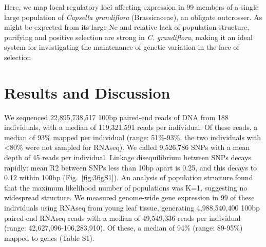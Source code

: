 Here, we map local regulatory loci affecting expression in 99 members of a single large population of \textit{Capsella grandiflora} (Brassicaceae), an obligate outcrosser. As might be expected from its large Ne and relative lack of population structure, purifying and positive selection are strong in \textit{C. grandiflora}\citep{Williamson2014-tf,St_onge2011-jz}, making it an ideal system for investigating the maintenance of genetic variation in the face of selection 

\section{Results and Discussion}
We sequenced 22,895,738,517 100bp paired-end reads of DNA from 188 individuals, with a median of 119,321,591 reads per individual. Of these reads, a median of 93\% mapped per individual (range: 51\%-93\%, the two individuals with \textless 80\% were not sampled for RNAseq). We called 9,526,786 SNPs with a mean depth of 45 reads per individual. Linkage disequilibrium between SNPs decays rapidly: mean R2 between SNPs less than 10bp apart is 0.25, and this decays to 0.12 within 100bp (Fig.~\ref{fig:3figS1}). An analysis of population structure \citep{Raj2014-im} found that the maximum likelihood number of populations was K=1, suggesting no widespread structure. We measured genome-wide gene expression in 99 of these individuals using RNAseq from young leaf tissue, generating 4,988,540,400 100bp paired-end RNAseq reads with a median of 49,549,336 reads per individual (range: 42,627,096-106,283,910). Of these, a median of 94\% (range: 89-95\%) mapped to genes (Table S1). 

